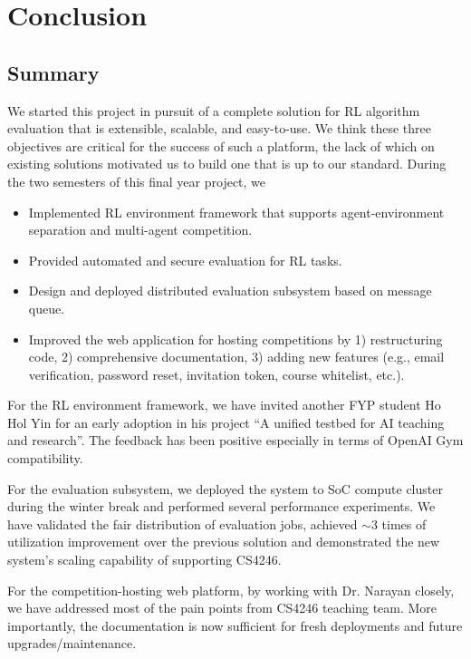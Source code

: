 \chapter{Conclusion}
\label{ch:conclusion}

\section{Summary}
\label{s:conclusion-summary}
We started this project in pursuit of a complete solution for RL algorithm evaluation that is extensible, scalable, and easy-to-use. We think these three objectives are critical for the success of such a platform, the lack of which on existing solutions motivated us to build one that is up to our standard.
During the two semesters of this final year project, we
\begin{itemize}
    \item Implemented RL environment framework that supports agent-environment separation and multi-agent competition.
    \item Provided automated and secure evaluation for RL tasks.
    \item Design and deployed distributed evaluation subsystem based on message queue.
    \item Improved the web application for hosting competitions by 1) restructuring code, 2) comprehensive documentation, 3) adding new features (e.g., email verification, password reset, invitation token, course whitelist, etc.).
\end{itemize}

For the RL environment framework, we have invited another FYP student Ho Hol Yin for an early adoption in his project ``A unified testbed for AI teaching and research''. The feedback has been positive especially in terms of OpenAI Gym compatibility.

For the evaluation subsystem, we deployed the system to SoC compute cluster during the winter break and performed several performance experiments. We have validated the fair distribution of evaluation jobs, achieved $\sim$3 times of utilization improvement over the previous solution and demonstrated the new system’s scaling capability of supporting CS4246.

For the competition-hosting web platform, by working with Dr. Narayan closely, we have addressed most of the pain points from CS4246 teaching team. More importantly, the documentation is now sufficient for fresh deployments and future upgrades/maintenance.

